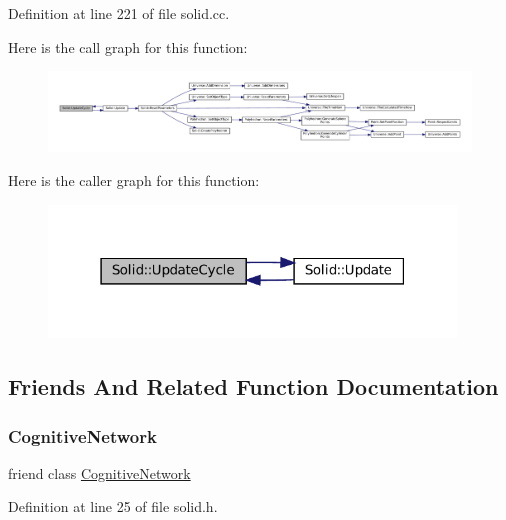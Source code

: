 Definition at line 221 of file solid.\+cc.

Here is the call graph for this function\+:\nopagebreak
\begin{figure}[H]
\begin{center}
\leavevmode
\includegraphics[width=350pt]{class_solid_a17239817eba0e5870454311857dca736_cgraph}
\end{center}
\end{figure}
Here is the caller graph for this function\+:\nopagebreak
\begin{figure}[H]
\begin{center}
\leavevmode
\includegraphics[width=307pt]{class_solid_a17239817eba0e5870454311857dca736_icgraph}
\end{center}
\end{figure}


\subsection{Friends And Related Function Documentation}
\mbox{\label{class_solid_ad04bbaef84caa0d408ec09a1c1302f5f}} 
\subsubsection{\texorpdfstring{Cognitive\+Network}{CognitiveNetwork}}
{\footnotesize\ttfamily friend class \mbox{\hyperlink{class_cognitive_network}{Cognitive\+Network}}\hspace{0.3cm}{\ttfamily [friend]}}



Definition at line 25 of file solid.\+h.

\mbox{\label{class_solid_ac790db405644a01723104c3c0c8128bb}} 
